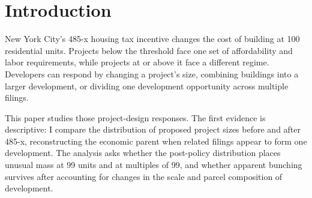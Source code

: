 \section{Introduction}

New York City's 485-x housing tax incentive changes the cost of building at 100 residential units. Projects below the threshold face one set of affordability and labor requirements, while projects at or above it face a different regime. Developers can respond by changing a project's size, combining buildings into a larger development, or dividing one development opportunity across multiple filings.

This paper studies those project-design responses. The first evidence is descriptive: I compare the distribution of proposed project sizes before and after 485-x, reconstructing the economic parent when related filings appear to form one development. The analysis asks whether the post-policy distribution places unusual mass at 99 units and at multiples of 99, and whether apparent bunching survives after accounting for changes in the scale and parcel composition of development.

